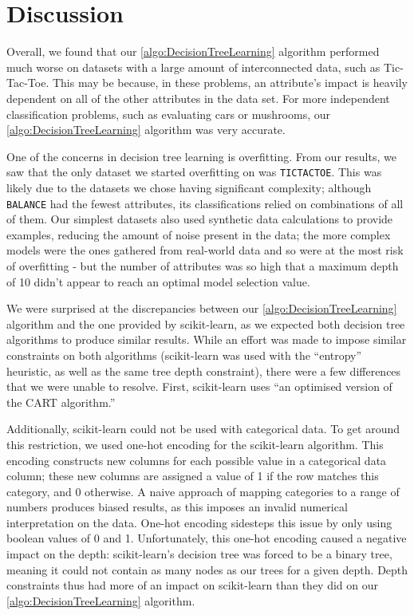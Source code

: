 \documentclass[screen, authorversion, nonacm, sigconf]{acmart}
\begin{document}
\section{Discussion}

Overall, we found that our \ref{algo:DecisionTreeLearning} algorithm performed much worse on datasets with a large amount of interconnected data, such as Tic-Tac-Toe. This may be because, in these problems, an attribute's impact is heavily dependent on all of the other attributes in the data set. For more independent classification problems, such as evaluating cars or mushrooms, our \ref{algo:DecisionTreeLearning} algorithm was very accurate.

One of the concerns in decision tree learning is overfitting. From our results, we saw that the only dataset we started overfitting on was \texttt{TICTACTOE}. This was likely due to the datasets we chose having significant complexity; although \texttt{BALANCE} had the fewest attributes, its classifications relied on combinations of all of them. Our simplest datasets also used synthetic data calculations to provide examples, reducing the amount of noise present in the data; the more complex models were the ones gathered from real-world data and so were at the most risk of overfitting - but the number of attributes was so high that a maximum depth of 10 didn't appear to reach an optimal model selection value.

We were surprised at the discrepancies between our \ref{algo:DecisionTreeLearning} algorithm and the one provided by scikit-learn, as we expected both decision tree algorithms to produce similar results. While an effort was made to impose similar constraints on both algorithms (scikit-learn was used with the ``entropy'' heuristic, as well as the same tree depth constraint), there were a few differences that we were unable to resolve. First, scikit-learn uses ``an optimised version of the CART \cite{DBLP:books/wa/BreimanFOS84} algorithm.''

Additionally, scikit-learn could not be used with categorical data. To get around this restriction, we used one-hot encoding for the scikit-learn algorithm. This encoding constructs new columns for each possible value in a categorical data column; these new columns are assigned a value of 1 if the row matches this category, and 0 otherwise. A naive approach of mapping categories to a range of numbers produces biased results, as this imposes an invalid numerical interpretation on the data. One-hot encoding sidesteps this issue by only using boolean values of 0 and 1. Unfortunately, this one-hot encoding caused a negative impact on the depth: scikit-learn's decision tree was forced to be a binary tree, meaning it could not contain as many nodes as our trees for a given depth. Depth constraints thus had more of an impact on scikit-learn than they did on our \ref{algo:DecisionTreeLearning} algorithm.
\end{document}
